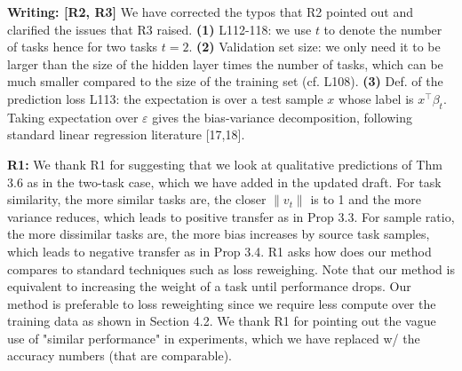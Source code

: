 \documentclass{article}
\begin{document}
\textbf{Writing: [R2, R3]}
We have corrected the typos that R2 pointed out and clarified the issues that R3 raised.
\textbf{(1)} L112-118: we use $t$ to denote the number of tasks hence for two tasks $t = 2$.
\textbf{(2)} Validation set size: we only need it to be larger than the size of the hidden layer times the number of tasks, which can be much smaller compared to the size of the training set (cf. L108).
\textbf{(3)} Def. of the prediction loss L113: the expectation is over a test sample $x$ whose label is $x^{\top}\beta_t$.
Taking expectation over $\varepsilon$ gives  the bias-variance decomposition, following standard linear regression literature [17,18].

\textbf{R1:}
We thank R1 for suggesting that we look at qualitative predictions of Thm 3.6 as in the two-task case, which we have added in the updated draft.
For task similarity, the more similar tasks are, the closer $\|{v_t}\|$ is to 1 and the more variance reduces, which leads to positive transfer as in Prop 3.3.
For sample ratio, the more dissimilar tasks are, the more bias increases by source task samples, which leads to negative transfer as in Prop 3.4.
R1 asks how does our method compares to standard techniques such as loss reweighing.
Note that our method is equivalent to increasing the weight of a task until performance drops.
Our method is preferable to loss reweighting since we require less compute over the training data as shown in Section 4.2.
We thank R1 for pointing out the vague use of "similar performance" in experiments, which we have replaced w/ the accuracy numbers (that are comparable). %
\end{document}
